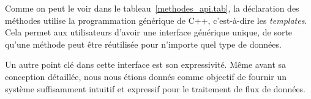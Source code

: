 %
%




Comme on peut le voir dans le tableau~\ref{methodes_api.tab}, la d\'eclaration des m\'ethodes utilise la programmation g\'en\'erique de C++, c'est-\`a-dire les \emph{templates}. Cela permet aux utilisateurs d'avoir une interface g\'en\'erique unique, de sorte qu'une m\'ethode peut \^etre r\'eutilis\'ee pour n'importe quel type de donn\'ees.


Un autre point cl\'e dans cette interface est son expressivit\'e. M\^eme avant sa conception d\'etaill\'ee, nous nous \'etions donn\'es comme objectif de fournir un syst\`eme suffisamment intuitif et expressif pour le traitement de flux de donn\'ees. 



